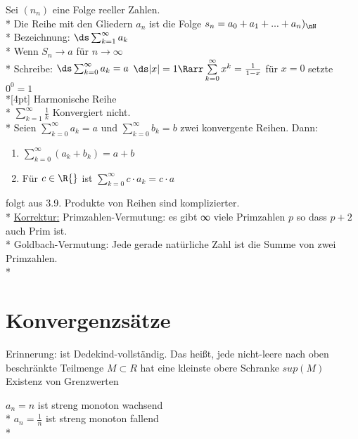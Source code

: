 %
\wdh
Sei $(n_n)$ eine Folge reeller Zahlen.\\*
Die Reihe mit den Gliedern $a_n$ ist die Folge $s_n = a_0 + a_1 + ... + a_n)_\nN$ \\*
Bezeichnung: $\ds\sum_{k=1}^{\infty} a_k$\\*
Wenn $S_n \to a$ für $n \to \infty$\\*
Schreibe: $\ds\sum_{k = 0}^{\infty} a_k = a$
$\ds|x| = 1 \Rarr \sum\limits_{k = 0}^{\infty} x^k = \frac{1}{1-x}$ für $x = 0$ setzte $0^0 = 1$\\*[4pt]
Harmonische Reihe\\*
$\displaystyle\sum\limits_{k = 1}^{\infty} \frac{1}{k}$ Konvergiert nicht.\\*
Seien $\sum\limits_{k = 0}^{\infty} a_k = a$ und $\sum\limits_{k = 0}^{\infty} b_k = b$ zwei konvergente Reihen. Dann:
\begin{enumerate}
\item{$\sum\limits_{k = 0}^{\infty} (a_k + b_k) = a + b$}
\item{Für $c \in \R{}$ ist $\sum\limits_{k = 0}^{\infty} c \cdot a_k = c \cdot a$}
\end{enumerate}
\bew
folgt aus 3.9.
\bem
Produkte von Reihen sind komplizierter.\\*
\ul{Korrektur:}
Primzahlen-Vermutung: es gibt ∞ viele Primzahlen $p$ so dass $p + 2$ auch Prim ist.\\*
Goldbach-Vermutung: Jede gerade natürliche Zahl ist die Summe von zwei Primzahlen.\\*
\chapter{Konvergenzsätze}
Erinnerung: \R{} ist Dedekind-vollständig. Das heißt, jede nicht-leere nach oben beschränkte Teilmenge $M \subset R$ hat eine kleinste obere Schranke $sup(M)$\ \Rarr{} Existenz von Grenzwerten

\bsp
$a_n = n$ ist streng monoton wachsend\\*
$a_n = \frac{1}{n}$ ist streng monoton fallend\\*


